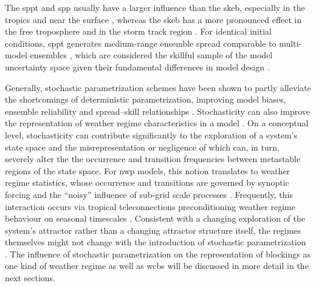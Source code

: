 The \gls{sppt} and \gls{spp} usually have a larger influence than the
\gls{skeb}, especially in the tropics and near the surface
\parencite{subramanianImpactStochasticPhysics2017,
    christensenStochasticParameterizationNino2017,
    strommenImpactStochasticParametrisations2018}, whereas the \gls{skeb} has a
more pronounced effect in the free troposphere and in the storm track region
\parencite{weisheimerAddressingModelError2014,
    bernerStochasticParameterizationNew2017}. For identical initial conditions,
\gls{sppt} generates  medium-range ensemble spread comparable to multi-model
ensembles \parencite{magnussonSkillMediumrangeForecast2022}, which are
considered the skillful sample of the model uncertainty space given their
fundamental differences in model design
\parencite{palmerRepresentingModelUncertainty2005,
    parkTIGGEPreliminaryResults2008,
    krishnamurtiReviewMultimodelSuperensemble2016}.

Generally, stochastic parametrization schemes have been shown to partly
alleviate the shortcomings of deterministic parametrization, improving model
biases, ensemble reliability and spread--skill relationships
\parencite{leutbecherStochasticRepresentationsModel2017,
    langRevisionStochasticallyPerturbed2021}. Stochasticity can also improve the
representation of weather regime characteristics in a model
\parencite{bernerSystematicModelError2012,
    dawsonSimulatingWeatherRegimes2015}. On a conceptual level, stochasticity can
contribute significantly to the exploration of a system's state space and
the misrepresentation or negligence of which can, in turn, severely alter the
the occurrence and transition frequencies between metastable regions of the
state space. For \gls{nwp} models, this notion translates to weather regime
statistics, whose occurrence and transitions are governed by synoptic forcing
and the \enquote{noisy} influence of sub-grid scale processes
\parencite{molteniRegimesWintertimeCirculation1990}. Frequently, this
interaction occurs via tropical teleconnections preconditioning weather regime
behaviour on seasonal timescales
\parencite{jungInfluenceStochasticParameterization2005}. Consistent with
a changing exploration of the system's attractor rather than a changing
attractor structure itself, the regimes themselves might not change with
the introduction of stochastic parametrization
\parencite{weisheimerAddressingModelError2014}. The influence of stochastic
parametrization on the representation of blockings as one kind of weather
regime as well as \glspl{wcb} will be discussed in more detail in the next
sections.


